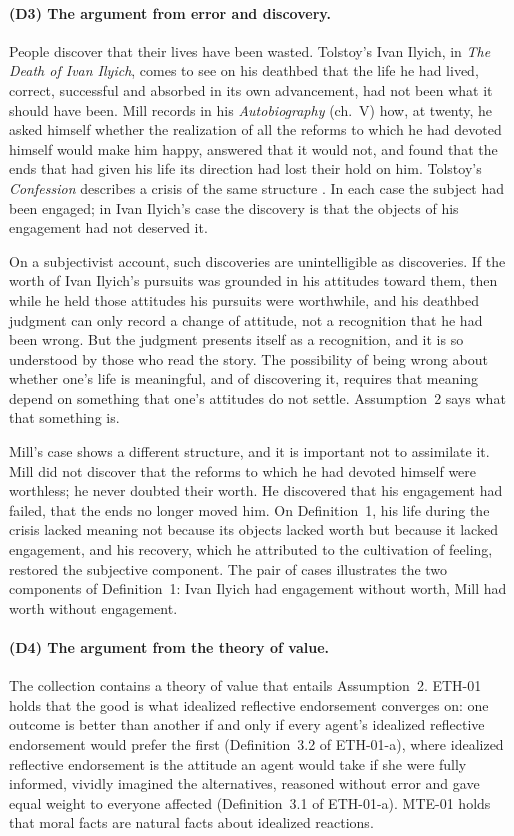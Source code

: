 \paragraph{(D3) The argument from error and discovery.} People discover that their lives have been wasted. Tolstoy's Ivan Ilyich, in \emph{The Death of Ivan Ilyich}, comes to see on his deathbed that the life he had lived, correct, successful and absorbed in its own advancement, had not been what it should have been. Mill records in his \emph{Autobiography} (ch.~V) how, at twenty, he asked himself whether the realization of all the reforms to which he had devoted himself would make him happy, answered that it would not, and found that the ends that had given his life its direction had lost their hold on him. Tolstoy's \emph{Confession} describes a crisis of the same structure \citep{Tolstoy1987}. In each case the subject had been engaged; in Ivan Ilyich's case the discovery is that the objects of his engagement had not deserved it.

On a subjectivist account, such discoveries are unintelligible as discoveries. If the worth of Ivan Ilyich's pursuits was grounded in his attitudes toward them, then while he held those attitudes his pursuits were worthwhile, and his deathbed judgment can only record a change of attitude, not a recognition that he had been wrong. But the judgment presents itself as a recognition, and it is so understood by those who read the story. The possibility of being wrong about whether one's life is meaningful, and of discovering it, requires that meaning depend on something that one's attitudes do not settle. Assumption~2 says what that something is.

Mill's case shows a different structure, and it is important not to assimilate it. Mill did not discover that the reforms to which he had devoted himself were worthless; he never doubted their worth. He discovered that his engagement had failed, that the ends no longer moved him. On Definition~1, his life during the crisis lacked meaning not because its objects lacked worth but because it lacked engagement, and his recovery, which he attributed to the cultivation of feeling, restored the subjective component. The pair of cases illustrates the two components of Definition~1: Ivan Ilyich had engagement without worth, Mill had worth without engagement.

\paragraph{(D4) The argument from the theory of value.} The collection contains a theory of value that entails Assumption~2. ETH-01 holds that the good is what idealized reflective endorsement converges on: one outcome is better than another if and only if every agent's idealized reflective endorsement would prefer the first (Definition~3.2 of ETH-01-a), where idealized reflective endorsement is the attitude an agent would take if she were fully informed, vividly imagined the alternatives, reasoned without error and gave equal weight to everyone affected (Definition~3.1 of ETH-01-a). MTE-01 holds that moral facts are natural facts about idealized reactions.

